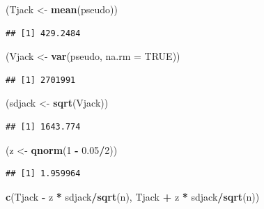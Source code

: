 \documentclass[
  12pt,
]{book}
\newenvironment{Shaded}{\begin{snugshade}}{\end{snugshade}}
\newcommand{\DataTypeTok}[1]{\textcolor[rgb]{0.13,0.29,0.53}{#1}}
\newcommand{\DecValTok}[1]{\textcolor[rgb]{0.00,0.00,0.81}{#1}}
\newcommand{\FloatTok}[1]{\textcolor[rgb]{0.00,0.00,0.81}{#1}}
\newcommand{\KeywordTok}[1]{\textcolor[rgb]{0.13,0.29,0.53}{\textbf{#1}}}
\newcommand{\NormalTok}[1]{#1}
\newcommand{\OperatorTok}[1]{\textcolor[rgb]{0.81,0.36,0.00}{\textbf{#1}}}
\newcommand{\OtherTok}[1]{\textcolor[rgb]{0.56,0.35,0.01}{#1}}
\newcommand{\StringTok}[1]{\textcolor[rgb]{0.31,0.60,0.02}{#1}}
\theoremstyle{definition}
\theoremstyle{definition}
\theoremstyle{definition}
\theoremstyle{remark}
\let\BeginKnitrBlock\begin \let\EndKnitrBlock\end
\begin{document}
\BeginKnitrBlock{exercise}
\protect\hypertarget{exr:unnamed-chunk-80}{}{\label{exr:unnamed-chunk-80} }
\EndKnitrBlock{exercise}

\begin{Shaded}
\begin{Highlighting}[]
\NormalTok{(Tjack <-}\StringTok{ }\KeywordTok{mean}\NormalTok{(pseudo))}
\end{Highlighting}
\end{Shaded}

\begin{verbatim}
## [1] 429.2484
\end{verbatim}

\begin{Shaded}
\begin{Highlighting}[]
\NormalTok{(Vjack <-}\StringTok{ }\KeywordTok{var}\NormalTok{(pseudo, }\DataTypeTok{na.rm =} \OtherTok{TRUE}\NormalTok{))}
\end{Highlighting}
\end{Shaded}

\begin{verbatim}
## [1] 2701991
\end{verbatim}

\begin{Shaded}
\begin{Highlighting}[]
\NormalTok{(sdjack <-}\StringTok{ }\KeywordTok{sqrt}\NormalTok{(Vjack))}
\end{Highlighting}
\end{Shaded}

\begin{verbatim}
## [1] 1643.774
\end{verbatim}

\begin{Shaded}
\begin{Highlighting}[]
\NormalTok{(z <-}\StringTok{ }\KeywordTok{qnorm}\NormalTok{(}\DecValTok{1} \OperatorTok{-}\StringTok{ }\FloatTok{0.05}\OperatorTok{/}\DecValTok{2}\NormalTok{))}
\end{Highlighting}
\end{Shaded}

\begin{verbatim}
## [1] 1.959964
\end{verbatim}

\begin{Shaded}
\begin{Highlighting}[]
\KeywordTok{c}\NormalTok{(Tjack }\OperatorTok{-}\StringTok{ }\NormalTok{z }\OperatorTok{*}\StringTok{ }\NormalTok{sdjack}\OperatorTok{/}\KeywordTok{sqrt}\NormalTok{(n), Tjack }\OperatorTok{+}\StringTok{ }\NormalTok{z }\OperatorTok{*}\StringTok{ }\NormalTok{sdjack}\OperatorTok{/}\KeywordTok{sqrt}\NormalTok{(n))}
\end{Highlighting}
\end{Shaded}
\end{document}
